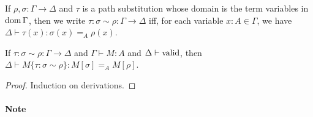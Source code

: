 If $\rho, \sigma : \Gamma \rightarrow \Delta$ and $\tau$ is a path substitution whose domain
is the term variables in $\operatorname{dom} \Gamma$, then we write
$\tau : \sigma \sim \rho : \Gamma \rightarrow \Delta$ iff, for each variable $x : A \in \Gamma$, we have
$\Delta \vdash \tau(x) : \sigma(x) =_A \rho(x)$.

\begin{lemma}
\label{lm:pathsub}
If $\tau : \sigma \sim \rho : \Gamma \rightarrow \Delta$ and $\Gamma \vdash M : A$ and $\Delta \vdash \mathrm{valid}$,
then $\Delta \vdash M \{ \tau : \sigma \sim \rho \} : M [ \sigma ] =_A M [ \rho ]$.
\end{lemma}

\begin{proof}
Induction on derivations.
\end{proof}

\paragraph{Note}



\begin{code}%
\> \AgdaSymbol{:}  \AgdaSymbol{\{}\AgdaSymbol{\}} \AgdaSymbol{\{}\AgdaSymbol{\}} \AgdaSymbol{\{} \AgdaSymbol{:}  \AgdaSymbol{\}} \AgdaSymbol{\{} \AgdaSymbol{:}  \AgdaSymbol{\}} \<[62]%
\>[62]\<%
\\
\>[0]\<[2]%
\>[2]\AgdaSymbol{\{}\AgdaSymbol{\}} \AgdaSymbol{\{}\AgdaSymbol{\}} \AgdaSymbol{\{}\AgdaSymbol{\}} \AgdaSymbol{\{}\AgdaSymbol{\}} \AgdaSymbol{\{}\AgdaSymbol{\}} \<%
\\
\>[0]\<[2]%
\>[2]\AgdaSymbol{(}    \AgdaSymbol{)}  \AgdaSymbol{(}        \AgdaSymbol{)} \<%
\\
\>[0]\<[2]%
\>[2]\AgdaSymbol{(}    \AgdaSymbol{)}  \AgdaSymbol{(}    \AgdaSymbol{)}  \<[30]%
\>[30]\<%
\\
\>[0]\<[2]%
\>[2]   \<[12]%
\>[12]\<%
\\
\>[0]\<[2]%
\>[2]                      \<%
\end{code}

